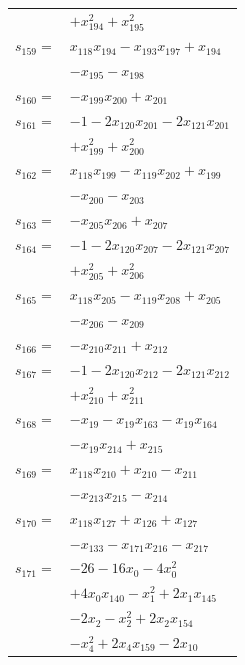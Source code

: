 \begin{longtable}{@{}r@{\;}l@{}}
 & \(\displaystyle +x_{194}^{2} +x_{195}^{2}\) \\[3pt]
\(s_{159}=\) & \(\displaystyle x_{118}x_{194} -x_{193}x_{197} +x_{194}\) \\
 & \(\displaystyle -x_{195} -x_{198}\) \\[3pt]
\(s_{160}=\) & \(\displaystyle -x_{199}x_{200} +x_{201}\) \\[3pt]
\(s_{161}=\) & \(\displaystyle -1 -2x_{120}x_{201} -2x_{121}x_{201}\) \\
 & \(\displaystyle +x_{199}^{2} +x_{200}^{2}\) \\[3pt]
\(s_{162}=\) & \(\displaystyle x_{118}x_{199} -x_{119}x_{202} +x_{199}\) \\
 & \(\displaystyle -x_{200} -x_{203}\) \\[3pt]
\(s_{163}=\) & \(\displaystyle -x_{205}x_{206} +x_{207}\) \\[3pt]
\(s_{164}=\) & \(\displaystyle -1 -2x_{120}x_{207} -2x_{121}x_{207}\) \\
 & \(\displaystyle +x_{205}^{2} +x_{206}^{2}\) \\[3pt]
\(s_{165}=\) & \(\displaystyle x_{118}x_{205} -x_{119}x_{208} +x_{205}\) \\
 & \(\displaystyle -x_{206} -x_{209}\) \\[3pt]
\(s_{166}=\) & \(\displaystyle -x_{210}x_{211} +x_{212}\) \\[3pt]
\(s_{167}=\) & \(\displaystyle -1 -2x_{120}x_{212} -2x_{121}x_{212}\) \\
 & \(\displaystyle +x_{210}^{2} +x_{211}^{2}\) \\[3pt]
\(s_{168}=\) & \(\displaystyle -x_{19} -x_{19}x_{163} -x_{19}x_{164}\) \\
 & \(\displaystyle -x_{19}x_{214} +x_{215}\) \\[3pt]
\(s_{169}=\) & \(\displaystyle x_{118}x_{210} +x_{210} -x_{211}\) \\
 & \(\displaystyle -x_{213}x_{215} -x_{214}\) \\[3pt]
\(s_{170}=\) & \(\displaystyle x_{118}x_{127} +x_{126} +x_{127}\) \\
 & \(\displaystyle -x_{133} -x_{171}x_{216} -x_{217}\) \\[3pt]
\(s_{171}=\) & \(\displaystyle -26 -16x_{0} -4x_{0}^{2}\) \\
 & \(\displaystyle +4x_{0}x_{140} -x_{1}^{2} +2x_{1}x_{145}\) \\
 & \(\displaystyle -2x_{2} -x_{2}^{2} +2x_{2}x_{154}\) \\
 & \(\displaystyle -x_{4}^{2} +2x_{4}x_{159} -2x_{10}\) \\

\end{longtable}
